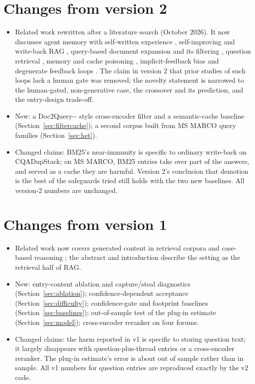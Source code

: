 \documentclass[11pt]{article}
\begin{document}
\section*{Changes from version 2}
\begin{itemize}
\item Related work rewritten after a literature search (October 2026). It now discusses agent memory with self-written experience \citep{xiong2025memory}, self-improving and write-back RAG \citep{chinthala2025bidirectional,lu2026writeback}, query-based document expansion and its filtering \citep{scholer2004query,nogueira2019doc2query,gospodinov2023doc2queryminus}, question retrieval \citep{jeon2005finding,sakata2019faq}, memory and cache poisoning \citep{dong2025minja,chen2024agentpoison,simvalidity2026}, implicit-feedback bias \citep{joachims2005accurately,joachims2007evaluating} and degenerate feedback loops \citep{jiang2019degenerate}. The claim in version 2 that prior studies of such loops lack a human gate was removed; the novelty statement is narrowed to the human-gated, non-generative case, the crossover and its prediction, and the entry-design trade-off.
\item New: a Doc2Query-{}-{} style cross-encoder filter and a semantic-cache baseline (Section~\ref{sec:filtercache}); a second corpus built from MS MARCO query families (Section~\ref{sec:het}).
\item Changed claims: BM25's near-immunity is specific to ordinary write-back on CQADupStack; on MS MARCO, BM25 entries take over part of the answers, and served as a cache they are harmful. Version 2's conclusion that demotion is the best of the safeguards tried still holds with the two new baselines. All version-2 numbers are unchanged.
\end{itemize}


\section*{Changes from version 1}
\begin{itemize}
\item Related work now covers generated content in retrieval corpora \citep{chen2024spiral,dai2024sourcebias,yu2026collapse,druck2026ragcollapse} and case-based reasoning \citep{aamodt1994cbr,smyth1995forget,zhu1999add}; the abstract and introduction describe the setting as the retrieval half of RAG.
\item New: entry-content ablation and capture/steal diagnostics (Section~\ref{sec:ablation}); confidence-dependent acceptance (Section~\ref{sec:difficulty}); confidence-gate and footprint baselines (Section~\ref{sec:baselines}); out-of-sample test of the plug-in estimate (Section~\ref{sec:model}); cross-encoder reranker on four forums.
\item Changed claims: the harm reported in v1 is specific to storing question text; it largely disappears with question-plus-thread entries or a cross-encoder reranker. The plug-in estimate's error is about \oosMAEAskTh{} out of sample rather than \plugMAE{} in sample. All v1 numbers for question entries are reproduced exactly by the v2 code.
\end{itemize}
\end{document}

